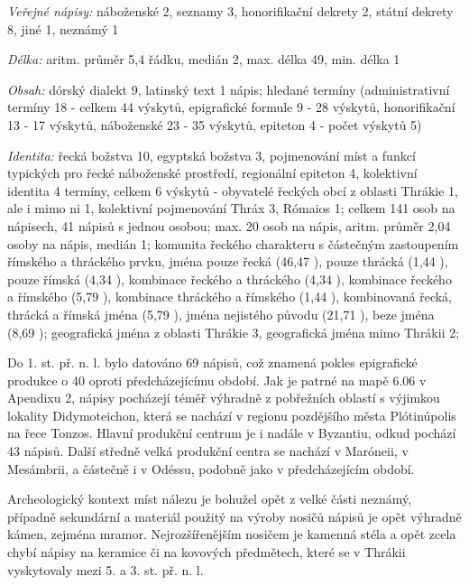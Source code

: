 {\em Veřejné nápisy:} náboženské 2, seznamy 3, honorifikační dekrety 2, státní dekrety 8, jiné 1, neznámý 1

{\em Délka:} aritm. průměr 5,4 řádku, medián 2, max. délka 49, min. délka 1

{\em Obsah:} dórský dialekt 9, latinský text 1 nápis; hledané termíny (administrativní termíny 18 - celkem 44 výskytů, epigrafické formule 9 - 28 výskytů, honorifikační 13 - 17 výskytů, náboženské 23 - 35 výskytů, epiteton 4 - počet výskytů 5)

{\em Identita:} řecká božstva 10, egyptská božstva 3, pojmenování míst a funkcí typických pro řecké náboženské prostředí, regionální epiteton 4, kolektivní identita 4 termíny, celkem 6 výskytů - obyvatelé řeckých obcí z oblasti Thrákie 1, ale i mimo ni 1, kolektivní pojmenování Thráx 3, Rómaios 1; celkem 141 osob na nápisech, 41 nápisů s jednou osobou; max. 20 osob na nápis, aritm. průměr 2,04 osoby na nápis, medián 1; komunita řeckého charakteru s částečným zastoupením římského a thráckého prvku, jména pouze řecká (46,47 ), pouze thrácká (1,44 ), pouze římská (4,34 ), kombinace řeckého a thráckého (4,34 ), kombinace řeckého a římského (5,79 ), kombinace thráckého a římského (1,44 ), kombinovaná řecká, thrácká a římská jména (5,79 ), jména nejistého původu (21,71 ), beze jména (8,69 ); geografická jména z oblasti Thrákie 3, geografická jména mimo Thrákii 2;

\NC\AR
\HL
\HL
\stoptable

Do 1. st. př. n. l. bylo datováno 69 nápisů, což znamená pokles epigrafické produkce o 40  oproti předcházejícímu období. Jak je patrné na mapě 6.06 v Apendixu 2, nápisy pocházejí téměř výhradně z pobřežních oblastí s výjimkou lokality Didymoteichon, která se nachází v regionu pozdějšího města Plótinúpolis na řece Tonzos. Hlavní produkční centrum je i nadále v Byzantiu, odkud pochází 43  nápisů. Další středně velká produkční centra se nachází v Maróneii, v Mesámbrii, a částečně i v Odéssu, podobně jako v předcházejícím období.

Archeologický kontext míst nálezu je bohužel opět z velké části neznámý, případně sekundární a materiál použitý na výroby nosičů nápisů je opět výhradně kámen, zejména mramor. Nejrozšířenějším nosičem je kamenná stéla a opět zcela chybí nápisy na keramice či na kovových předmětech, které se v Thrákii vyskytovaly mezi 5. a 3. st. př. n. l.

